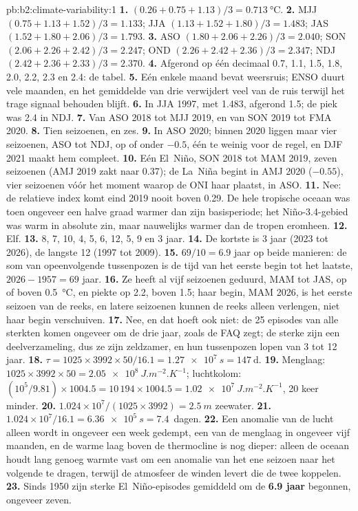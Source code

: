 \begin{solution}{pb:b2:climate-variability:1}
\textbf{1.} $(0.26 + 0.75 + 1.13)/3 = \qty{0.713}{\celsius}$.
\textbf{2.} MJJ $(0.75 + 1.13 + 1.52)/3 = 1.133$; JJA $(1.13 + 1.52 + 1.80)/3 = 1.483$; JAS $(1.52 +
1.80 + 2.06)/3 = 1.793$.
\textbf{3.} ASO $(1.80 + 2.06 + 2.26)/3 = 2.040$; SON $(2.06 + 2.26 + 2.42)/3 = 2.247$; OND $(2.26
+ 2.42 + 2.36)/3 = 2.347$; NDJ $(2.42 + 2.36 + 2.33)/3 = 2.370$.
\textbf{4.} Afgerond op één decimaal 0.7, 1.1, 1.5, 1.8, 2.0, 2.2, 2.3 en 2.4: de tabel.
\textbf{5.} Eén enkele maand bevat weersruis; ENSO duurt vele maanden, en het gemiddelde van drie
verwijdert veel van de ruis terwijl het trage signaal behouden blijft.
\textbf{6.} In JJA 1997, met 1.483, afgerond 1.5; de piek was 2.4 in NDJ.
\textbf{7.} Van ASO 2018 tot MJJ 2019, en van SON 2019 tot FMA 2020.
\textbf{8.} Tien seizoenen, en zes.
\textbf{9.} In ASO 2020; binnen 2020 liggen maar vier seizoenen, ASO tot NDJ, op of onder $-0.5$, één
te weinig voor de regel, en DJF 2021 maakt hem compleet.
\textbf{10.} Eén El~Niño, SON 2018 tot MAM 2019, zeven seizoenen (AMJ 2019 zakt naar 0.37); de
La~Niña begint in AMJ 2020 ($-0.55$), vier seizoenen vóór het moment waarop de ONI haar plaatst, in ASO.
\textbf{11.} Nee: de relatieve index komt eind 2019 nooit boven 0.29. De hele tropische oceaan was
toen ongeveer een halve graad warmer dan zijn basisperiode; het Niño-3.4-gebied was warm in
absolute zin, maar nauwelijks warmer dan de tropen eromheen.
\textbf{12.} Elf.
\textbf{13.} 8, 7, 10, 4, 5, 6, 12, 5, 9 en 3 jaar.
\textbf{14.} De kortste is 3 jaar (2023 tot 2026), de langste 12 (1997 tot 2009).
\textbf{15.} $69/10 = 6.9$ jaar op beide manieren: de som van opeenvolgende tussenpozen is de tijd van het
eerste begin tot het laatste, $2026 - 1957 = 69$ jaar.
\textbf{16.} Ze heeft al vijf seizoenen geduurd, MAM tot JAS, op of boven \qty{0.5}{\celsius}, en
piekte op 2.2, boven 1.5; haar begin, MAM 2026, is het eerste seizoen van de reeks, en latere seizoenen
kunnen de reeks alleen verlengen, niet haar begin verschuiven.
\textbf{17.} Nee, en dat hoeft ook niet: de 25 episodes van alle sterkten komen ongeveer om de drie jaar, zoals de FAQ zegt;
de sterke zijn een deelverzameling, dus ze zijn zeldzamer, en hun tussenpozen lopen van 3 tot 12 jaar.
\textbf{18.} $\tau = 1025 \times 3992 \times 50/16.1 = \qty{1.27e7}{s} = \qty{147}{\day}$.
\textbf{19.} Menglaag: $1025 \times 3992 \times 50 = \qty{2.05e8}{J.m^{-2}.K^{-1}}$; luchtkolom:
$(10^5/9.81) \times 1004.5 = 10\,194 \times 1004.5 = \qty{1.02e7}{J.m^{-2}.K^{-1}}$, 20 keer
minder.
\textbf{20.} $1.024 \times 10^7/(1025 \times 3992) = \qty{2.5}{m}$ zeewater.
\textbf{21.} $1.024 \times 10^7/16.1 = \qty{6.36e5}{s} = 7.4$~dagen.
\textbf{22.} Een anomalie van de lucht alleen wordt in ongeveer een week gedempt, een van de menglaag in
ongeveer vijf maanden, en de warme laag boven de thermocline is nog dieper: alleen de oceaan houdt
lang genoeg warmte vast om een anomalie van het ene seizoen naar het volgende te dragen, terwijl de atmosfeer
de winden levert die de twee koppelen.
\textbf{23.} Sinds 1950 zijn sterke El~Niño-episodes gemiddeld om de \textbf{6.9 jaar} begonnen,
ongeveer zeven.
\end{solution}
